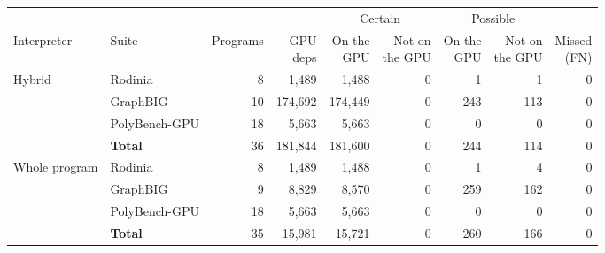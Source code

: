 \begin{tabular}{llrrrrrrr}
\toprule
 & & & & \multicolumn{2}{c}{Certain} & \multicolumn{2}{c}{Possible} & \\
\cmidrule(lr){5-6} \cmidrule(lr){7-8}
Interpreter & Suite & Programs & \shortstack{GPU\\deps} & \shortstack{On the\\GPU} & \shortstack{Not on\\the GPU} & \shortstack{On the\\GPU} & \shortstack{Not on\\the GPU} & \shortstack{Missed\\(FN)} \\
\midrule
\multirow{4}{*}{Hybrid} & Rodinia & 8 & 1,489 & 1,488 & 0 & 1 & 1 & 0 \\
 & GraphBIG & 10 & 174,692 & 174,449 & 0 & 243 & 113 & 0 \\
 & PolyBench-GPU & 18 & 5,663 & 5,663 & 0 & 0 & 0 & 0 \\
 & \textbf{Total} & 36 & 181,844 & 181,600 & 0 & 244 & 114 & 0 \\
\midrule
\multirow{4}{*}{Whole program} & Rodinia & 8 & 1,489 & 1,488 & 0 & 1 & 4 & 0 \\
 & GraphBIG & 9 & 8,829 & 8,570 & 0 & 259 & 162 & 0 \\
 & PolyBench-GPU & 18 & 5,663 & 5,663 & 0 & 0 & 0 & 0 \\
 & \textbf{Total} & 35 & 15,981 & 15,721 & 0 & 260 & 166 & 0 \\
\bottomrule
\end{tabular}

